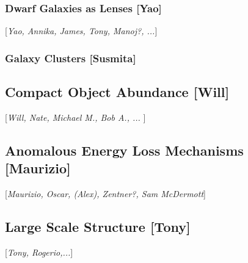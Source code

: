 \documentclass[modern,linenumbers]{aastex62}
\newcommand{\Contributors}[1]{ {\footnotesize [\textit{#1}]}}
\newcommand{\Contact}[1]{ {\footnotesize [\textbf{#1}]}}
\begin{document}
\subsubsection{Dwarf Galaxies as Lenses \Contact{Yao}}
\Contributors{Yao, Annika, James, Tony, Manoj?, ...}
\label{sec:halo_profile_group}


% 
% 

\subsubsection{Galaxy Clusters \Contact{Susmita}}
\label{sec:halo_profile_clusters}



\subsection{Compact Object Abundance \Contact{Will}}
\Contributors{Will, Nate, Michael M., Bob A., ... }
\label{sec:compact_objects}



\subsection{Anomalous Energy Loss Mechanisms\Contact{Maurizio}}
\Contributors{Maurizio, Oscar, (Alex), Zentner?, Sam McDermott}
\label{sec:cooling}




\subsection{Large Scale Structure \Contact{Tony}}
\Contributors{Tony, Rogerio,...}
\end{document}
